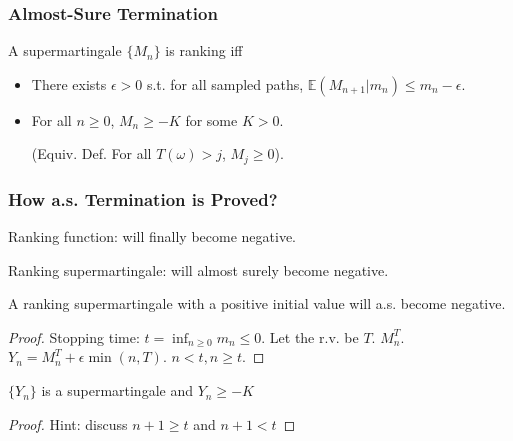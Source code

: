 \documentclass[11pt]{beamer}
\begin{document}

\begin{frame}\frametitle{Almost-Sure Termination}

\begin{definition}

A supermartingale $\{M_n\}$ is ranking iff
\begin{itemize}
\item There exists $\epsilon > 0$ s.t. for all sampled paths, $\mathbb{E}(M_{n+1}|m_n) \le m_n - \epsilon$.

\item For all $n\ge 0$, $M_n \ge -K$ for some $K >0$. 

(Equiv. Def. For all $T(\omega) > j$, $M_j\ge 0$).
\end{itemize}
\end{definition}
\end{frame}

\begin{frame}\frametitle{How a.s. Termination is Proved?}
Ranking function: will finally become negative.

Ranking supermartingale: will almost surely become negative.
\pause
\begin{theorem}
A ranking supermartingale with a positive initial value will a.s. become negative.
\end{theorem}
\pause
\begin{proof}
Stopping time: $t = \inf_{n\ge 0} m_n\le 0$. Let the r.v. be $T$.
$M_{n}^{T}$. 
$Y_n = M_{n}^{T} + \epsilon\min(n,T)$.
$n < t, n \ge t$.
\end{proof}
\pause
\begin{lemma}
$\{Y_n\}$ is a supermartingale and $Y_n \ge -K$
\end{lemma}
\begin{proof}
Hint: discuss $n+1 \ge t$ and $n+1 < t$
\end{proof}

\end{frame}
\end{document}
